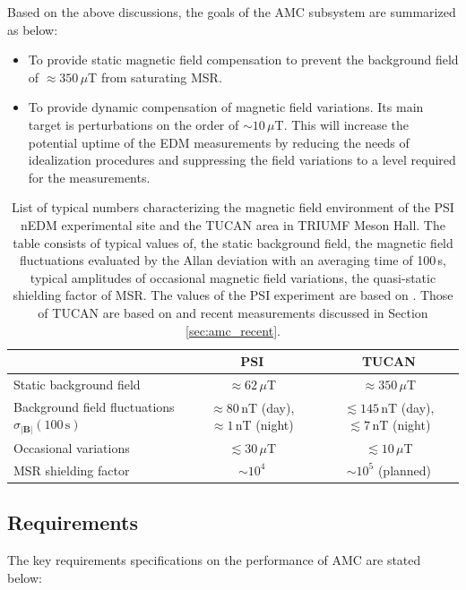 Based on the above discussions, the goals of the AMC subsystem are summarized as below:
\begin{itemize}
  \item To provide static magnetic field compensation to prevent the background field of $\approx 350\,\mu$T from saturating MSR. 
  \item To provide dynamic compensation of magnetic field variations. Its main target is perturbations on the order of $\sim 10\,\mu$T. This will increase the potential uptime of the EDM measurements by reducing the needs of idealization procedures and suppressing the field variations to a level required for the measurements.
\end{itemize}

\begin{table}[tb!]
\centering 
\begin{tabular}{|l||c|c|}
\hline

 & \multicolumn{1}{c|}{\textbf{PSI}} & \multicolumn{1}{c|}{\textbf{TUCAN}} \\ \hline\hline 
Static background field & $\approx62\,\mu$T & $\approx 350\,\mu$T            \\ \hline
Background field fluctuations $\sigma_{|\mathbf{B}|}(100\,\mathrm{s})$ & $\approx 80\,\mathrm{nT}$ (day), $\approx 1\,\mathrm{nT}$ (night) & $\lesssim 145\,\mathrm{nT}$ (day), $\lesssim 7\,\mathrm{nT}$ (night)
\\ \hline
Occasional variations  & $\lesssim30\,\mu$T  & $\lesssim 10\,\mu$T      \\ \hline
 MSR shielding factor    &  $\sim 10^4$  &  $\sim 10^5$ (planned) \\ \hline 
\end{tabular}
\caption{List of typical numbers characterizing the magnetic field environment of the PSI nEDM experimental site and the TUCAN area in TRIUMF Meson Hall. The table consists of typical values of, the static background field, the magnetic field fluctuations evaluated by the Allan deviation with an averaging time of 100\,s, typical amplitudes of occasional magnetic field variations, the quasi-static shielding factor of MSR. The values of the PSI experiment are based on \cite{Afach2014,Fra:phd,baker2014apparatus}. Those of TUCAN are based on \cite{Sarte2013} and recent measurements discussed in Section \ref{sec:amc_recent}. 
}
\label{tab:amc_comparaion}
\end{table}


\subsection{Requirements}
The key requirements specifications on the performance of AMC are stated below:


